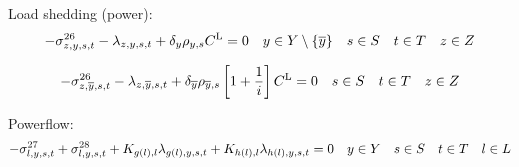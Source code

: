 \documentclass{article}
\begin{document}
Load shedding (power):
\begin{equation}
- \dNonNegativeLostLoad - \dPowerBalance + \cDiscountRate \cScenarioDuration \cLostLoadCost = 0 \quad \iYear \in \sYears \setminus \{\iYearTerminal\} \quad \iScenario \in \sScenarios \quad \iInterval \in \sIntervals \quad \iZone \in \sZones
\end{equation}

\begin{equation}
- \dNonNegativeLostLoad[\iZone,\iYearTerminal,\iScenario,\iInterval] - \dPowerBalance[\iZone,\iYearTerminal,\iScenario,\iInterval] + \cDiscountRate[\iYearTerminal] \cScenarioDuration[\iYearTerminal,\iScenario] \left[1 + \frac{1}{\cInterestRate}\right] \cLostLoadCost = 0 \quad \iScenario \in \sScenarios \quad \iInterval \in \sIntervals \quad \iZone \in \sZones
\end{equation}


Powerflow:
\begin{equation}
-\dMinPowerFlow + \dMaxPowerFlow + \cIncidenceMatrix[g(\iLink), \iLink] \dPowerBalance[g(\iLink),\iYear,\iScenario,\iInterval] + \cIncidenceMatrix[h(\iLink), \iLink] \dPowerBalance[h(\iLink),\iYear,\iScenario,\iInterval] = 0 \quad \iYear \in \sYears \quad \iScenario \in \sScenarios \quad \iInterval \in \sIntervals \quad \iLink \in \sLinks
\label{eqn: dual powerflow}
\end{equation}
 
\end{document}
